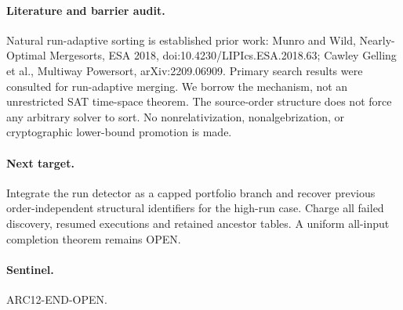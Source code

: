 \documentclass{article}
\begin{document}
\paragraph{Literature and barrier audit.}
Natural run-adaptive sorting is established prior work:
Munro and Wild, Nearly-Optimal Mergesorts, ESA 2018,
doi:10.4230/LIPIcs.ESA.2018.63;
Cawley Gelling et al., Multiway Powersort, arXiv:2209.06909.
Primary search results were consulted for run-adaptive merging.
We borrow the mechanism, not an unrestricted SAT time-space theorem.
The source-order structure does not force any arbitrary solver to sort.
No nonrelativization, nonalgebrization, or cryptographic lower-bound
promotion is made.

\paragraph{Next target.}
Integrate the run detector as a capped portfolio branch and recover
previous order-independent structural identifiers for the high-run case.
Charge all failed discovery, resumed executions and retained ancestor
tables. A uniform all-input completion theorem remains OPEN.
\paragraph{Sentinel.} ARC12-END-OPEN.
\end{document}
